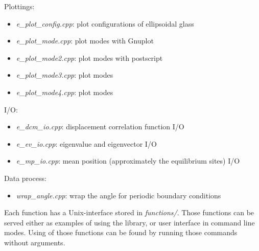 Plottings:
\begin{itemize}
\item \emph{e\_plot\_config.cpp}: plot configurations of ellipsoidal glass
\item \emph{e\_plot\_mode.cpp}: plot modes with Gnuplot
\item \emph{e\_plot\_mode2.cpp}: plot modes with postscript
\item \emph{e\_plot\_mode3.cpp}: plot modes
\item \emph{e\_plot\_mode4.cpp}: plot modes
\end{itemize}

I/O:
\begin{itemize}
\item \emph{e\_dcm\_io.cpp}: displacement correlation function I/O
\item \emph{e\_ev\_io.cpp}: eigenvalue and eigenvector I/O
\item \emph{e\_mp\_io.cpp}: mean position (approximately the equilibrium sites) I/O
\end{itemize}

Data process:
\begin{itemize}
\item \emph{wrap\_angle.cpp}: wrap the angle for periodic boundary conditions
\end{itemize}

Each function has a Unix-interface stored in \emph{functions/}. Those functions can be served either as examples of using the library, or user interface in command line modes. Using of those functions can be found by running those commands without arguments.
